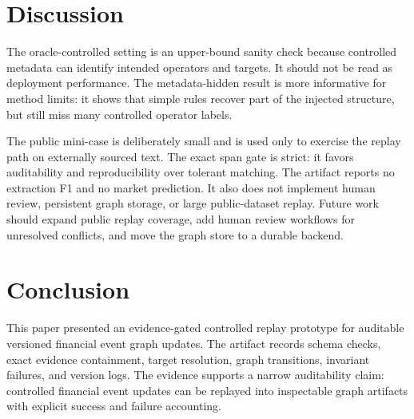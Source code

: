 \documentclass[3p,times,procedia]{elsarticle}
\begin{document}


\section{Discussion}

The oracle-controlled setting is an upper-bound sanity check because controlled metadata can identify intended operators and targets. It should not be read as deployment performance. The metadata-hidden result is more informative for method limits: it shows that simple rules recover part of the injected structure, but still miss many controlled operator labels.

The public mini-case is deliberately small and is used only to exercise the replay path on externally sourced text. The exact span gate is strict: it favors auditability and reproducibility over tolerant matching. The artifact reports no extraction F1 and no market prediction. It also does not implement human review, persistent graph storage, or large public-dataset replay. Future work should expand public replay coverage, add human review workflows for unresolved conflicts, and move the graph store to a durable backend.

\section{Conclusion}

This paper presented an evidence-gated controlled replay prototype for auditable versioned financial event graph updates. The artifact records schema checks, exact evidence containment, target resolution, graph transitions, invariant failures, and version logs. The evidence supports a narrow auditability claim: controlled financial event updates can be replayed into inspectable graph artifacts with explicit success and failure accounting.



\end{document}
